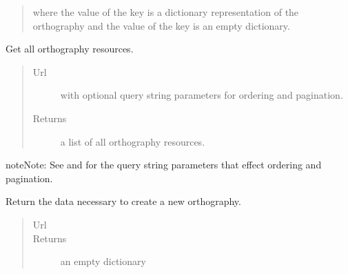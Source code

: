 \documentclass[letterpaper,10pt,english]{sphinxmanual}
\begin{document}
\begin{fulllineitems}
\begin{fulllineitems}
\begin{quote}
\begin{description}
where the value of the  key is a dictionary
representation of the orthography and the value of the  key
is an empty dictionary.


\end{description}\end{quote}

\end{fulllineitems}


\begin{fulllineitems}
\label{api:onlinelinguisticdatabase.controllers.orthographies.OrthographiesController.index}
Get all orthography resources.
\begin{quote}\begin{description}
\item[{Url }] \leavevmode
{} with optional query string parameters
for ordering and pagination.

\item[{Returns}] \leavevmode
a list of all orthography resources.

\end{description}\end{quote}

\begin{notice}{note}{Note:}
See  and  for the
query string parameters that effect ordering and pagination.
\end{notice}

\end{fulllineitems}


\begin{fulllineitems}
\label{api:onlinelinguisticdatabase.controllers.orthographies.OrthographiesController.new}
Return the data necessary to create a new orthography.
\begin{quote}\begin{description}
\item[{Url }] \leavevmode
{}

\item[{Returns}] \leavevmode
an empty dictionary


\end{description}
\end{quote}
\end{fulllineitems}
\end{fulllineitems}
\end{document}

